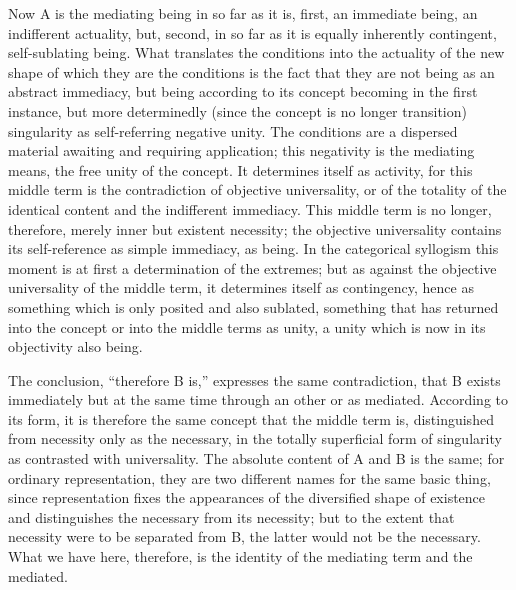 Now A is the mediating being in so far as it is,
first, an immediate being, an indifferent actuality,
but, second, in so far as it is equally
inherently contingent, self-sublating being.
What translates the conditions into the actuality
of the new shape of which they are the conditions is
the fact that they are not being as an abstract immediacy,
but being according to its concept
becoming in the first instance,
but more determinedly
(since the concept is no longer transition)
singularity as self-referring negative unity.
The conditions are a dispersed material
awaiting and requiring application;
this negativity is the mediating means,
the free unity of the concept.
It determines itself as activity,
for this middle term is
the contradiction of objective universality,
or of the totality of the identical content
and the indifferent immediacy.
This middle term is no longer, therefore,
merely inner but existent necessity;
the objective universality contains its
self-reference as simple immediacy, as being.
In the categorical syllogism this moment is at first
a determination of the extremes;
but as against the objective universality of the middle term,
it determines itself as contingency,
hence as something which is only posited and also sublated,
something that has returned into the concept
or into the middle terms as unity,
a unity which is now in its objectivity also being.

The conclusion, “therefore B is,”
expresses the same contradiction,
that B exists immediately
but at the same time
through an other or as mediated.
According to its form,
it is therefore the same concept
that the middle term is,
distinguished from necessity only as the necessary,
in the totally superficial form of singularity
as contrasted with universality.
The absolute content of A and B is the same;
for ordinary representation,
they are two different names
for the same basic thing,
since representation fixes the appearances
of the diversified shape of existence
and distinguishes the necessary from its necessity;
but to the extent that necessity were to be separated from B,
the latter would not be the necessary.
What we have here, therefore, is
the identity of the mediating term and the mediated.

